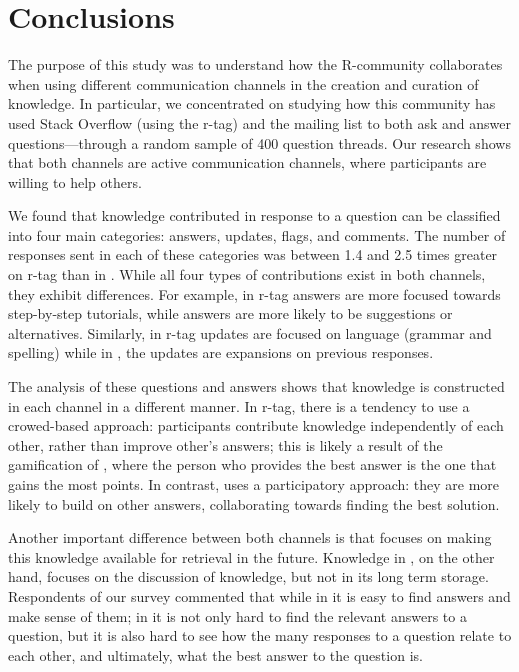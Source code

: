 \section{Conclusions}
\label{cha:conclusion}

The purpose of this study was to understand how the R-community collaborates when using different communication channels in the creation and curation of knowledge.
In particular, we concentrated on studying how this community has used Stack Overflow (using the r-tag) and the \RH mailing list to both ask and answer questions---through a random sample of 400 question threads. Our research shows that both channels are active communication channels, where participants are willing to help others. 

We found that knowledge contributed in response to a question can be classified into four main categories: answers, updates, flags, and comments. The number of
responses sent in each of these categories was between 1.4 and 2.5 times greater on \SO r-tag than in \RH. While all four types of contributions exist in both
channels, they exhibit differences. For example, in \SO r-tag answers are more focused towards step-by-step tutorials, while \RH answers are more
likely to be suggestions or alternatives. Similarly, in \SO r-tag updates are focused on language (grammar and spelling) while in \RH, the updates are
expansions on previous responses.

The analysis of these questions and answers shows that knowledge is constructed in each channel in a different manner. In \SO r-tag, there is a tendency to use
a crowed-based approach: participants contribute knowledge independently of each other, rather than improve other's answers; this is likely a result of the
gamification of \SO, where the person who provides the best answer is the one that gains the most points.
In contrast, \RH uses a participatory approach: they are more likely to build on other answers, collaborating towards finding the best solution.

Another important difference between both channels is that \SO focuses on making this knowledge available for retrieval in the future. Knowledge in \RH, on the
other hand, focuses on the discussion of knowledge, but not in its long term storage. Respondents of our survey commented that while in \SO it is easy to find answers
and make sense of them; in \RH it is not only hard to find the relevant answers to a question, but it is also hard to see how the many responses to a question
relate to each other, and ultimately, what the best answer to the question is.

